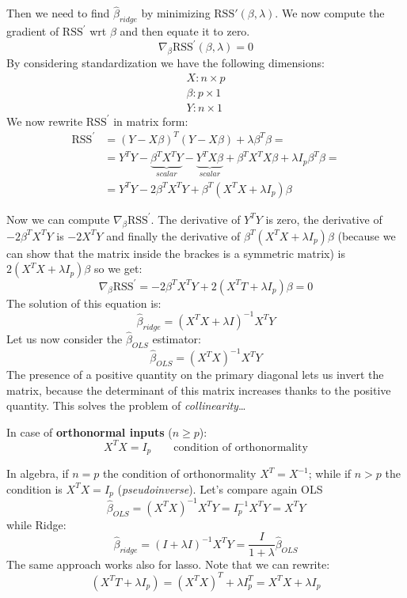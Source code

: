 Then we need to find $\hat{\beta}_{ridge}$ by minimizing $\text{RSS}'(\beta, \lambda)$. We now compute the gradient of $\text{RSS}^{\prime}$ wrt $\beta$ and then equate it to zero.
\[
    \nabla_\beta \text{RSS}^{\prime} (\beta, \lambda) = 0
\]
By considering standardization we have the following dimensions:
\begin{align*}
    X: n\times p     \\
    \beta: p\times 1 \\
    Y: n \times 1
\end{align*}
We now rewrite $\text{RSS}^{\prime}$ in matrix form:
\begin{align*}
    \text{RSS}^{\prime} & = (Y - X \beta)^T (Y - X \beta) + \lambda \beta^T \beta =                                                                                              \\
                        & = Y^T Y - \underbrace{\beta^T X^T Y}_{scalar} - \underbrace{Y^T X \beta}_{scalar}+                 \beta^T X^T X \beta + \lambda I_{p} \beta^T \beta = \\
                        & = Y^T Y - 2 \beta^T X^T Y + \beta^T (X^T X + \lambda I_p) \beta
\end{align*}

Now we can compute $\nabla_\beta \text{RSS}^{\prime} $. The derivative of $Y^T Y$ is zero, the derivative of $- 2 \beta^T X^T Y $ is $- 2 X^T Y $ and finally the derivative of $\beta^T (X^T X + \lambda I_p) \beta$ (because we can show that the matrix inside the brackes is a symmetric matrix) is
$2(X^T X + \lambda I_p) \beta$ so we get:
\[
    \nabla_\beta\text{RSS}^{\prime} = - 2 \beta^T X^T Y + 2(X^T T + \lambda I_p) \beta = 0
\]
The solution of this equation is:
\[
    \hat{\beta}_{ridge} = (X^T X + \lambda I)^{-1} X^T Y
\]
Let us now consider the $\hat{\beta}_{OLS}$ estimator:
\[
    \hat{\beta}_{OLS} = (X^T X)^{-1} X^T Y
\]
The presence of a positive quantity on the primary diagonal lets us invert the matrix, because the determinant of this matrix increases thanks to the positive quantity. This solves the problem of \textit{collinearity}\dots

In case of \textbf{orthonormal inputs} ($n \geq p$):
\[
    X^T X = I_p \qquad \text{condition of orthonormality}
\]

In algebra, if $n = p$ the condition of orthonormality $X^T = X^{-1}$; while if $n > p$ the condition is $X^T X = I_p$ (\textit{pseudoinverse}).
Let's compare again OLS
\[
    \hat{\beta}_{OLS} = (X^T X)^{-1} X^T Y = I_p^{-1} X^T Y = X^T Y
\]
while Ridge:
\[
    \hat{\beta}_{ridge} = (I + \lambda I)^{-1} X^T Y = \frac{I}{1+\lambda} \hat{\beta}_{OLS}
\]
The same approach works also for lasso.
Note that we can rewrite:
\[
    (X^T T + \lambda I_p) = (X^T X)^T + \lambda  I_p^T  = X^T X + \lambda I_p
\]
